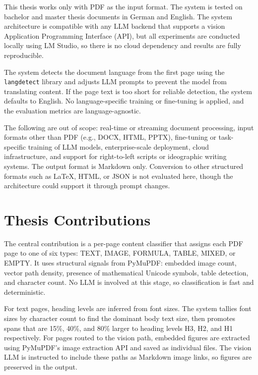 This thesis works only with PDF as the input format. The system is tested
on bachelor and master thesis documents in German and English. The system
architecture is compatible with any LLM backend that supports a vision
Application Programming Interface (API),
but all experiments are conducted locally using LM Studio, so there is no
cloud dependency and results are fully reproducible.

The system detects the document language from the first page using the
\texttt{langdetect} library and adjusts LLM prompts to prevent the model
from translating content. If the page text is too short for reliable
detection, the system defaults to English. No language-specific training or
fine-tuning is applied, and the evaluation metrics are language-agnostic.

The following are out of scope: real-time or streaming document processing,
input formats other than PDF (e.g., DOCX, HTML, PPTX), fine-tuning or
task-specific training of LLM models, enterprise-scale deployment, cloud
infrastructure, and support for right-to-left scripts or ideographic writing
systems. The output format is Markdown only. Conversion to other structured
formats such as LaTeX, HTML, or JSON is not evaluated here, though the
architecture could support it through prompt changes.

\section{Thesis Contributions}

The central contribution is a per-page content classifier that assigns each
PDF page to one of six types: TEXT, IMAGE, FORMULA, TABLE, MIXED, or EMPTY.
It uses structural signals from PyMuPDF: embedded image count, vector path
density, presence of mathematical Unicode symbols, table detection, and
character count. No LLM is involved at this stage, so classification is fast
and deterministic.

For text pages, heading levels are inferred from font sizes. The system
tallies font sizes by character count to find the dominant body text size, then
promotes spans that are 15\%, 40\%, and 80\% larger to heading levels H3, H2,
and H1 respectively. For pages routed to the vision path,
embedded figures are extracted using PyMuPDF's image extraction API and
saved as individual files. The vision LLM is instructed to include these paths
as Markdown image links, so figures are preserved in the output.

